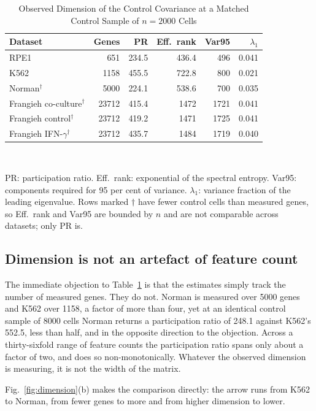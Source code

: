 \documentclass[journal,twoside,web]{ieeecolor}
\begin{document}
\begin{table}[!t]
\caption{Observed Dimension of the Control Covariance at a Matched Control Sample of $n = 2000$ Cells}
\label{tab:dimension}
\centering
\setlength{\tabcolsep}{4pt}
\begin{tabular}{lrrrrr}
\hline
Dataset & Genes & PR & Eff.\ rank & Var95 & $\lambda_1$ \\
\hline
RPE1 & 651 & 234.5 & 436.4 & 496 & 0.041 \\
K562 & 1158 & 455.5 & 722.8 & 800 & 0.021 \\
Norman$^{\dagger}$ & 5000 & 224.1 & 538.6 & 700 & 0.035 \\
Frangieh co-culture$^{\dagger}$ & 23712 & 415.4 & 1472 & 1721 & 0.041 \\
Frangieh control$^{\dagger}$ & 23712 & 419.2 & 1471 & 1725 & 0.041 \\
Frangieh IFN-$\gamma^{\dagger}$ & 23712 & 435.7 & 1484 & 1719 & 0.040 \\
\hline
\end{tabular}
\\[2pt]
\parbox{\columnwidth}{\footnotesize PR: participation ratio. Eff.\ rank:
exponential of the spectral entropy. Var95: components required for 95 per
cent of variance. $\lambda_1$: variance fraction of the leading eigenvalue.
Rows marked $\dagger$ have fewer control cells than measured genes, so
Eff.\ rank and Var95 are bounded by $n$ and are not comparable across
datasets; only PR is.}
\end{table}

\subsection{Dimension is not an artefact of feature count}
The immediate objection to Table~\ref{tab:dimension} is that the estimates
simply track the number of measured genes. They do not. Norman is measured
over 5000 genes and K562 over 1158, a factor of more than four, yet at an
identical control sample of 8000 cells Norman returns a participation ratio of
248.1 against K562's 552.5, less than half, and in the opposite direction to
the objection. Across a thirty-sixfold range of feature counts the
participation ratio spans only about a factor of two, and does so
non-monotonically. Whatever the observed dimension is measuring, it is not the
width of the matrix.

Fig.~\ref{fig:dimension}(b) makes the comparison directly: the arrow runs from
K562 to Norman, from fewer genes to more and from higher dimension to lower.
\end{document}

